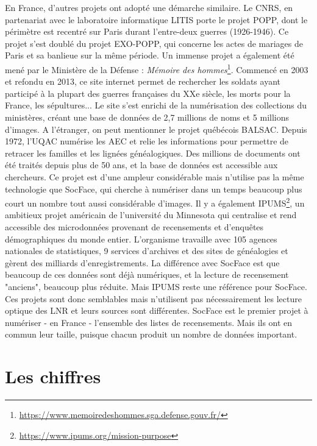 En France, d'autres projets ont adopté une démarche similaire.  Le CNRS, en partenariat avec le laboratoire informatique \gls{LITIS} porte le projet POPP, dont le périmètre est recentré sur Paris durant l’entre-deux guerres (1926-1946). Ce projet s’est doublé du projet EXO-POPP, qui concerne les actes de mariages de Paris et sa banlieue sur la même période. Un immense projet a également été mené par le Ministère de la Défense : \textit{Mémoire des hommes}\footnote{\href{Mémoire des hommes}{https://www.memoiredeshommes.sga.defense.gouv.fr/}}. Commencé en 2003 et refondu en 2013, ce site internet permet de rechercher les soldats ayant participé à la plupart des guerres françaises du XXe siècle, les morts pour la France, les sépultures... Le site s'est enrichi de la numérisation des collections du ministères, créant une base de données de 2,7 millions de noms et 5 millions d'images. 
A l'étranger, on peut mentionner le projet québécois BALSAC. Depuis 1972, l’UQAC numérise les \gls{AEC} et relie les informations pour permettre de retracer les familles et les lignées généalogiques. Des millions de documents ont été traités depuis plus de 50 ans, et la base de données est accessible aux chercheurs. Ce projet est d'une ampleur considérable mais n'utilise pas la même technologie que SocFace, qui cherche à numériser dans un temps beaucoup plus court un nombre tout aussi considérable d'images. Il y a également IPUMS\footnote{\href{IPUMS}{https://www.ipums.org/mission-purpose}}, un ambitieux projet américain de l'université du Minnesota qui centralise et rend accessible des microdonnées provenant de recensements et d'enquêtes démographiques du monde entier. L'organisme travaille avec 105 agences nationales de statistiques, 9 services d'archives et des sites de généalogies et gèrent des milliards d'enregistrements. La différence avec SocFace est que beaucoup de ces données sont déjà numériques, et la lecture de recensement "anciens", beaucoup plus réduite. Mais IPUMS reste une référence pour SocFace.\\
Ces projets sont donc semblables mais n'utilisent pas nécessairement les lecture optique des \gls{LNR} et leurs sources sont différentes. SocFace est le premier projet à numériser - en France - l'ensemble des listes de recensements. Mais ils ont en commun leur taille, puisque chacun produit un nombre de données important. 

    \section{Les chiffres}

